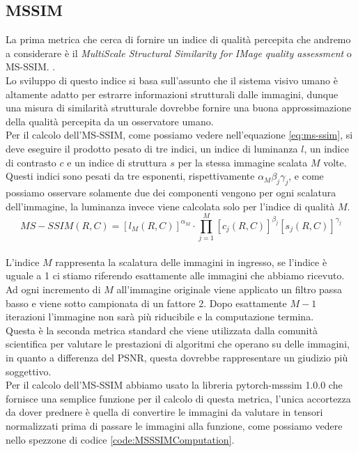 \subsection{MSSIM}
La prima metrica che cerca di fornire un indice di qualità percepita che andremo a considerare è il \textit{MultiScale Structural Similarity for IMage quality assessment} o MS-SSIM. \cite{wang2003multiscale}.\\
Lo sviluppo di questo indice si basa sull’assunto che il sistema visivo umano è altamente adatto per estrarre informazioni strutturali dalle immagini, dunque una misura di similarità strutturale dovrebbe fornire una buona approssimazione della qualità percepita da un osservatore umano.\\
Per il calcolo dell’MS-SSIM, come possiamo vedere nell’equazione \ref{eq:ms-ssim}, si deve eseguire il prodotto pesato di tre indici, un indice di luminanza $l$, un indice di contrasto $c$ e un indice di struttura $s$ per la stessa immagine scalata $M$ volte. Questi indici sono pesati da tre esponenti, rispettivamente $\alpha_{M} \beta_{j} \gamma_{j}$, e come possiamo osservare solamente due dei componenti vengono per ogni scalatura dell’immagine, la luminanza invece viene calcolata solo per l’indice di qualità $M$.\\
\begin{equation}\label{eq:ms-ssim}
    MS-SSIM(R,C) = [l_{M}(R,C)]^{\alpha_{M}} \cdot \prod_{j=1}^{M}[c_{j}(R,C)]^{\beta_{j}} [s_{j}(R,C)]^{\gamma_{j}} 
\end{equation}\\
L’indice $M$ rappresenta la scalatura delle immagini in ingresso, se l’indice è uguale a 1 ci stiamo riferendo esattamente alle immagini che abbiamo ricevuto. Ad ogni incremento di $M$ all’immagine originale viene applicato un filtro passa basso e viene sotto campionata di un fattore 2. Dopo esattamente $M-1$ iterazioni l’immagine non sarà più riducibile e la computazione termina.\\
Questa è la seconda metrica standard che viene utilizzata dalla comunità scientifica per valutare le prestazioni di algoritmi che operano su delle immagini, in quanto a differenza del PSNR, questa dovrebbe rappresentare un giudizio più soggettivo.\\
Per il calcolo dell’MS-SSIM abbiamo usato la libreria pytorch-msssim 1.0.0 che fornisce una semplice funzione per il calcolo di questa metrica, l’unica accortezza da dover prednere è quella di convertire le immagini da valutare in tensori normalizzati prima di passare le immagini alla funzione, come possiamo vedere nello spezzone di codice \ref{code:MSSSIMComputation}.\\

